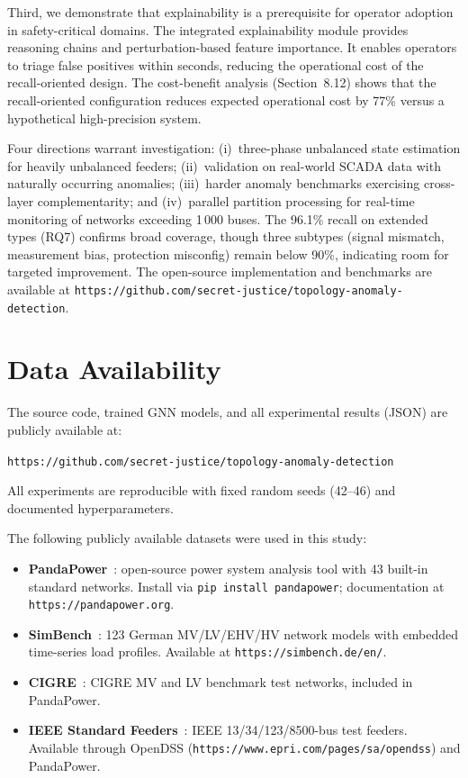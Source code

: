 \documentclass[research]{fcs}
\begin{document}
Third, we demonstrate that explainability is a prerequisite for operator adoption in safety-critical domains. The integrated explainability module provides reasoning chains and perturbation-based feature importance. It enables operators to triage false positives within seconds, reducing the operational cost of the recall-oriented design. The cost-benefit analysis (Section~8.12) shows that the recall-oriented configuration reduces expected operational cost by 77\% versus a hypothetical high-precision system.

Four directions warrant investigation: (i)~three-phase unbalanced state estimation for heavily unbalanced feeders; (ii)~validation on real-world SCADA data with naturally occurring anomalies; (iii)~harder anomaly benchmarks exercising cross-layer complementarity; and (iv)~parallel partition processing for real-time monitoring of networks exceeding 1\,000 buses. The 96.1\% recall on extended types (RQ7) confirms broad coverage, though three subtypes (signal mismatch, measurement bias, protection misconfig) remain below 90\%, indicating room for targeted improvement. The open-source implementation and benchmarks are available at \texttt{https://github.com/secret-justice/topology-anomaly-detection}.

\fontsize{8.5pt}{10pt}\selectfont

\section*{Data Availability}
The source code, trained GNN models, and all experimental results (JSON) are publicly available at:
\begin{center}
\texttt{https://github.com/secret-justice/topology-anomaly-detection}
\end{center}
All experiments are reproducible with fixed random seeds (42--46) and documented hyperparameters.

The following publicly available datasets were used in this study:
\begin{itemize}
\item \textbf{PandaPower}~\cite{pandapower2018}: open-source power system analysis tool with 43 built-in standard networks. Install via \texttt{pip install pandapower}; documentation at \texttt{https://pandapower.org}.
\item \textbf{SimBench}~\cite{simbench2020}: 123 German MV/LV/EHV/HV network models with embedded time-series load profiles. Available at \texttt{https://simbench.de/en/}.
\item \textbf{CIGRE}~\cite{cigre_mv2014}: CIGRE MV and LV benchmark test networks, included in PandaPower.
\item \textbf{IEEE Standard Feeders}~\cite{ieee13bus1991}: IEEE 13/34/123/8500-bus test feeders. Available through OpenDSS (\texttt{https://www.epri.com/pages/sa/opendss}) and PandaPower.
\end{itemize}



\end{document}
